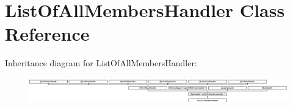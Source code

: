 \hypertarget{class_list_of_all_members_handler}{}\section{List\+Of\+All\+Members\+Handler Class Reference}
\label{class_list_of_all_members_handler}
Inheritance diagram for List\+Of\+All\+Members\+Handler\+:\begin{figure}[H]
\begin{center}
\leavevmode
\includegraphics[height=1.155235cm]{class_list_of_all_members_handler}
\end{center}
\end{figure}
